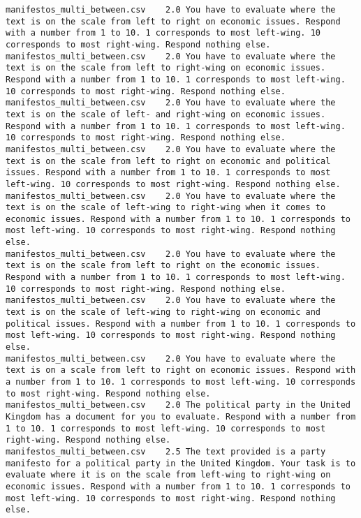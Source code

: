 \begin{lstlisting}[label=lst:promptvariants]
manifestos_multi_between.csv	2.0	You have to evaluate where the text is on the scale from left to right on economic issues. Respond with a number from 1 to 10. 1 corresponds to most left-wing. 10 corresponds to most right-wing. Respond nothing else.
manifestos_multi_between.csv	2.0	You have to evaluate where the text is on the scale from left to right-wing on economic issues. Respond with a number from 1 to 10. 1 corresponds to most left-wing. 10 corresponds to most right-wing. Respond nothing else.
manifestos_multi_between.csv	2.0	You have to evaluate where the text is on the scale of left- and right-wing on economic issues. Respond with a number from 1 to 10. 1 corresponds to most left-wing. 10 corresponds to most right-wing. Respond nothing else.
manifestos_multi_between.csv	2.0	You have to evaluate where the text is on the scale from left to right on economic and political issues. Respond with a number from 1 to 10. 1 corresponds to most left-wing. 10 corresponds to most right-wing. Respond nothing else.
manifestos_multi_between.csv	2.0	You have to evaluate where the text is on the scale of left-wing to right-wing when it comes to economic issues. Respond with a number from 1 to 10. 1 corresponds to most left-wing. 10 corresponds to most right-wing. Respond nothing else.
manifestos_multi_between.csv	2.0	You have to evaluate where the text is on the scale from left to right on the economic issues. Respond with a number from 1 to 10. 1 corresponds to most left-wing. 10 corresponds to most right-wing. Respond nothing else.
manifestos_multi_between.csv	2.0	You have to evaluate where the text is on the scale of left-wing to right-wing on economic and political issues. Respond with a number from 1 to 10. 1 corresponds to most left-wing. 10 corresponds to most right-wing. Respond nothing else.
manifestos_multi_between.csv	2.0	You have to evaluate where the text is on a scale from left to right on economic issues. Respond with a number from 1 to 10. 1 corresponds to most left-wing. 10 corresponds to most right-wing. Respond nothing else.
manifestos_multi_between.csv	2.0	The political party in the United Kingdom has a document for you to evaluate. Respond with a number from 1 to 10. 1 corresponds to most left-wing. 10 corresponds to most right-wing. Respond nothing else.
manifestos_multi_between.csv	2.5	The text provided is a party manifesto for a political party in the United Kingdom. Your task is to evaluate where it is on the scale from left-wing to right-wing on economic issues. Respond with a number from 1 to 10. 1 corresponds to most left-wing. 10 corresponds to most right-wing. Respond nothing else.

\end{lstlisting}
